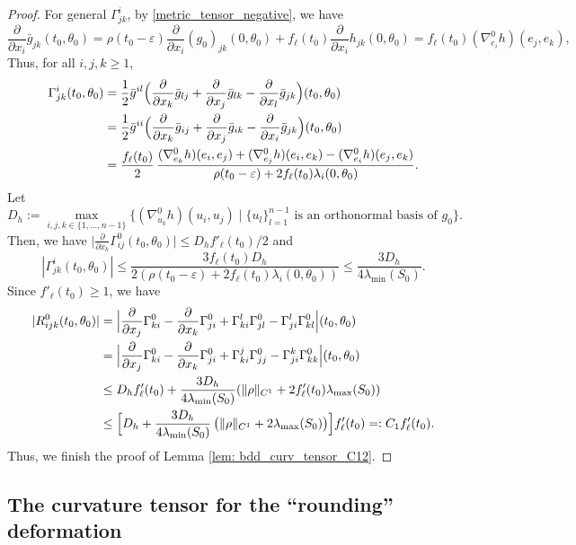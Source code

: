 \documentclass[10pt]{amsart}
\let\sep\mid
\theoremstyle{definition}
\let\eps\varepsilon
\renewcommand{\>}{{\rangle}}
\newcommand{\<}{{\langle}}
\begin{document}
\begin{proof}
For general $\Gamma^i_{jk}$, by \eqref{metric_tensor_negative}, we have
\[
\frac{\partial}{\partial x_i}\bar g_{jk}(t_0,\theta_0)=\rho(t_0-\eps)\frac{\partial}{\partial x_i}(g_0)_{jk}(0,\theta_0)+f_\ell(t_0)\frac{\partial}{\partial x_i}h_{jk} (0,\theta_0)=f_\ell(t_0)(\nabla^0_{e_i}h)(e_j,e_k),
\]
Thus, for all $i,j,k\geq 1$,
\begin{align*}
\Gamma^i_{jk}(t_0,\theta_0) &= \frac{1}{2}\bar g^{il}\Bigl(\frac{\partial}{\partial x_k}\bar g_{lj}+\frac{\partial}{\partial x_j}\bar g_{lk}-\frac{\partial}{\partial x_l}\bar g_{jk}\Bigr)(t_0,\theta_0) \\
&= \frac{1}{2}\bar g^{ii}\Bigl(\frac{\partial}{\partial x_k}\bar g_{ij}+\frac{\partial}{\partial x_j}\bar g_{ik}-\frac{\partial}{\partial x_i}\bar g_{jk}\Bigr)(t_0,\theta_0) \\\
&=\frac{f_\ell(t_0)}{2}\,\frac{(\nabla^0_{e_k}h)(e_i,e_j)+(\nabla^0_{e_j}h)(e_i,e_k)-(\nabla^0_{e_i}h)(e_j,e_k)}{\rho(t_0-\eps)+2f_\ell(t_0)\lambda_i(0,\theta_0)}.
\end{align*}
Let
\[
D_h := \max_{ i,j,k\in\{1,\ldots, n-1\}} \bigl\{(\nabla^0_{u_k}h)(u_i,u_j) \sep\{u_l\}_{l=1}^{n-1} \text{ is an orthonormal basis of }g_0 \bigr\}.
\]
Then, we have $\bigl|\frac{\partial}{\partial x_k}\Gamma^0_{ij}(t_0,\theta_0)\bigr|\leq D_hf'_\ell(t_0)/2$ and
\[
|\Gamma^i_{jk}(t_0,\theta_0)|\leq \frac{3f_\ell(t_0)D_h}{2(\rho(t_0-\eps)+2f_\ell(t_0)\lambda_i(0,\theta_0))}\leq \frac{3D_h}{4\lambda_{\min}(S_0)}.
\]
Since $f'_\ell(t_0)\geq 1$, we have
\begin{align*}
|R^0_{ijk}(t_0,\theta_0)| &= \Bigl|\frac{\partial}{\partial x_j}\Gamma^0_{ki}-\frac{\partial}{\partial x_k}\Gamma^0_{ji}+\Gamma^l_{ki}\Gamma^0_{jl}-\Gamma^l_{ji}\Gamma^0_{kl}\Bigr|(t_0,\theta_0)\\
&= \Bigl|\frac{\partial}{\partial x_j}\Gamma^0_{ki}-\frac{\partial}{\partial x_k}\Gamma^0_{ji}+\Gamma^j_{ki}\Gamma^0_{jj}-\Gamma^k_{ji}\Gamma^0_{kk}\Bigr|(t_0,\theta_0)\\
&\leq D_hf'_\ell(t_0)+\frac{3D_h}{4\lambda_{\min}(S_0)}(\|\rho\|_{C^1}+2f'_\ell(t_0)\lambda_{\max}(S_0))\\
&\leq \Bigl[D_h+\frac{3D_h}{4\lambda_{\min}(S_0)}\,\bigl(\|\rho\|_{C^1}+2\lambda_{\max}(S_0)\bigr)\Bigr]f'_\ell(t_0)=:C_1f'_\ell(t_0).
\end{align*}
Thus, we finish the proof of Lemma \ref{lem: bdd_curv_tensor_C12}.
\end{proof}

\subsection{The curvature tensor for the ``rounding'' deformation}
\end{document}
